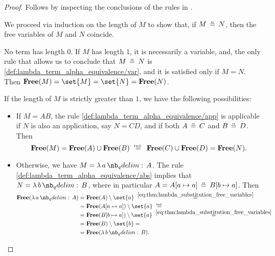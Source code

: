 \begin{proof}
   Follows by inspecting the conclusions of the rules in .

   We proceed via induction on the length of \( M \) to show that, if \( M \aequiv N \), then the free variables of \( M \) and \( N \) coincide.

  No term has length \( 0 \). If \( M \) has length \( 1 \), it is necessarily a variable, and, the only rule that allows us to conclude that \( M \aequiv N \) is \ref{def:lambda_term_alpha_equivalence/var}, and it is satisfied only if \( M = N \). Then \( \op*{Free}(M) = \set{ M } = \set{ N } = \op*{Free}(N) \).

  If the length of \( M \) is strictly greater than \( 1 \), we have the following possibilities:
  \begin{itemize}
    \item If \( M = AB \), the rule \ref{def:lambda_term_alpha_equivalence/app} is applicable if \( N \) is also an application, say \( N = CD \), and if both \( A \aequiv C \) and \( B \aequiv D \). Then
    \begin{equation*}
      \op*{Free}(M)
      =
      \op*{Free}(A) \cup \op*{Free}(B)
      \reloset{\T{ind.}} =
      \op*{Free}(C) \cup \op*{Free}(D)
      =
      \op*{Free}(N).
    \end{equation*}

    \item Otherwise, we have \( M = \qabs a A \). The rule \ref{def:lambda_term_alpha_equivalence/abs} implies that \( N = \qabs b B \), where in particular \( A = A[a \mapsto a] \aequiv B[b \mapsto a] \). Then
    \begin{align*}
      \op*{Free}(\qabs a A)
      &=
      \op*{Free}(A) \setminus \set{ a }
      \reloset {\eqref{eq:thm:lambda_substitution_free_variables}} = \\ &=
      \op*{Free}(A[a \mapsto a]) \setminus \set{ a }
      \reloset{\T{ind.}} = \\ &=
      \op*{Free}(B[b \mapsto a]) \setminus \set{ a }
      \reloset {\eqref{eq:thm:lambda_substitution_free_variables}} = \\ &=
      \op*{Free}(B) \setminus \set{ b }
      = \\ &=
      \op*{Free}(\qabs b B).
    \end{align*}
  \end{itemize}


\end{proof}
